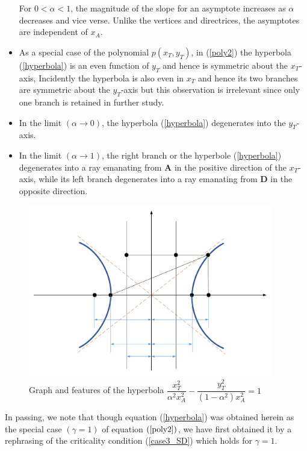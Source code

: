 \begin{itemize}
For $0<\alpha<1$, the magnitude of the slope for an asymptote increases as $\alpha$ decreases and vice verse. Unlike the vertices and directrices, the asymptotes are independent of $x_A$.
\item As a special case of the polynomial $p(x_T,y_T)$, in (\ref{poly2}) the hyperbola (\ref{hyperbola}) is an even function of $y_T$ and hence is symmetric about the $x_T$-axis, Incidently the hyperbola is also even in $x_T$ and hence its two branches are symmetric about the $y_T$-axis but this observation is irrelevant since only one branch is retained in further study.
\item In the limit $(\alpha\to0)$, the hyperbola (\ref{hyperbola}) degenerates into the $y_T$-axis.
\item In the limit $(\alpha\to1)$, the right branch or the hyperbole (\ref{hyperbola}) degenerates into a ray emanating from $\boldsymbol{A}$ in the positive direction of the $x_T$-axis, while its left branch degenerates into a ray emanating from $\boldsymbol{D}$ in the opposite direction.
\end{itemize}    


\begin{figure}[htb]
\centering
\includegraphics[width=0.95\textwidth]{fig/Drawing5_1.pdf}
\caption{Graph and features of the hyperbola $\dfrac{x_T^2}{\alpha^2 x_A^2} - \dfrac{y_T^2}{(1-\alpha^2)x_A^2}=1$ }
\label{hyperbola graph}
\end{figure}


In passing, we note that though equation (\ref{hyperbola}) was obtained herein as the special case $(\gamma=1)$ of equation $(\ref{poly2})$, we have first obtained it by a rephrasing of the criticality condition (\ref{case3_SD}) which holds for $\gamma=1$.\\


